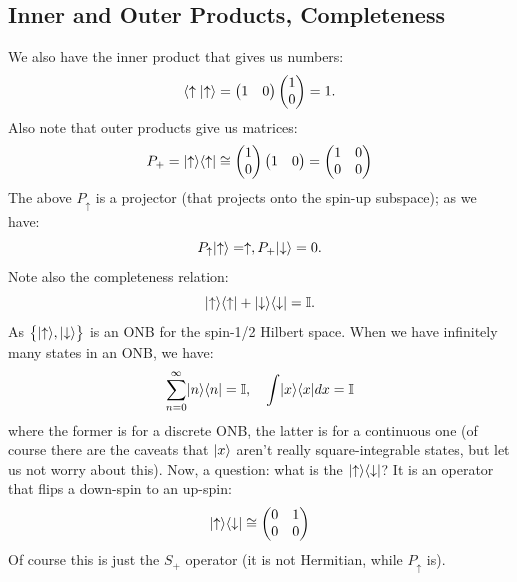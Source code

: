 \subsection{Inner and Outer Products, Completeness}
We also have the inner product that gives us numbers:
\begin{equation}
    \langle \uparrow \lvert \uparrow \rangle = \begin{pmatrix}1 & 0\end{pmatrix}\begin{pmatrix}1\\0\end{pmatrix} = 1.
\end{equation}
Also note that outer products give us matrices:
\begin{equation}
    P_+ = \lvert \uparrow \rangle \langle \uparrow \rvert \cong \begin{pmatrix}1\\0\end{pmatrix}\begin{pmatrix}1&0\end{pmatrix} = \begin{pmatrix}1&0\\0&0\end{pmatrix}
\end{equation}
The above $P_\uparrow$ is a projector (that projects onto the spin-up subspace); as we have:
\begin{equation}
    P_\uparrow\lvert \uparrow \rangle = \uparrow, P_+\lvert \downarrow \rangle = 0.
\end{equation}
Note also the completeness relation:
\begin{equation}
    \lvert \uparrow \rangle \langle \uparrow \rvert + \lvert \downarrow \rangle \langle \downarrow \rvert = \mathbb{I}.
\end{equation}
As $\set{\lvert \uparrow \rangle, \lvert \downarrow \rangle}$ is an ONB for the spin-1/2 Hilbert space. When we have infinitely many states in an ONB, we have:
\begin{equation}
    \sum_{n=0}^\infty \lvert n \rangle \langle n \rvert = \mathbb{I}, \quad \int \lvert x \rangle \langle x \rvert dx = \mathbb{I}
\end{equation}
where the former is for a discrete ONB, the latter is for a continuous one (of course there are the caveats that $\lvert x \rangle$ aren't really square-integrable states, but let us not worry about this). Now, a question: what is the $\lvert \uparrow \rangle \langle \downarrow \rvert$? It is an operator that flips a down-spin to an up-spin:
\begin{equation}
    \lvert \uparrow \rangle \langle \downarrow \rvert \cong \begin{pmatrix}0&1\\0&0\end{pmatrix}
\end{equation}
Of course this is just the $S_+$ operator (it is not Hermitian, while $P_\uparrow$ is).

